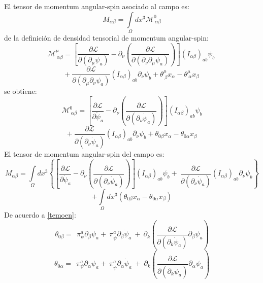 \documentclass[a4paper,12pt]{article}
\begin{document}
El tensor de momentum angular-spin asociado al campo es:
\begin{equation}
M_{\alpha\beta}=\int\limits_{\Omega}dx^{3}\mathscr{M}_{\ \alpha\beta}^{0}
\label{angularder}
\end{equation}
de la definición de densidad tensorial de momentum angular-spin:
\begin{equation}
\mathscr{M}_{\ \alpha\beta}^\mu=\left[\frac{\partial \mathscr{L} }{\partial(\partial_{\mu} \psi_a)}-\partial_{\nu}\left(\frac{\partial\mathscr{L} }{\partial(\partial_{\nu}\partial_{\mu} \psi_a)}  \right) \right](I_{\alpha\beta})_{ab}\psi_{b}\ 
\end{equation}
$$+\ \frac{\partial\mathscr{L} }{\partial(\partial_{\mu}\partial_{\nu} \psi_a)}(I_{\alpha\beta})_{ab}\partial_\nu\psi_{b}+\theta_{\ \beta}^\mu x_\alpha-\theta_{\ \alpha}^\mu x_\beta $$
se obtiene:
\begin{equation}
\mathscr{M}_{\ \alpha\beta}^0=\left[\frac{\partial \mathscr{L} }{\partial\dot \psi_a}-\partial_{\nu}\left(\frac{\partial\mathscr{L} }{\partial(\partial_{\nu}\dot \psi_a)}  \right) \right](I_{\alpha\beta})_{ab}\psi_{b}
\end{equation}
$$+\ \frac{\partial\mathscr{L} }{\partial(\partial_{\nu} \dot\psi_a)}(I_{\alpha\beta})_{ab}\partial_\nu\psi_{b}+\theta_{0\beta} x_\alpha-\theta_{0\alpha} x_\beta $$
El tensor de momentum angular-spin del campo es:
\begin{equation}
M_{\alpha\beta}=\int\limits_{\Omega}dx^{3}\left\{\left[\frac{\partial \mathscr{L} }{\partial\dot \psi_a}-\partial_{\nu}\left(\frac{\partial\mathscr{L} }{\partial(\partial_{\nu}\dot \psi_a)}  \right) \right](I_{\alpha\beta})_{ab}\psi_{b}+\ \frac{\partial\mathscr{L} }{\partial(\partial_{\nu} \dot\psi_a)}(I_{\alpha\beta})_{ab}\partial_\nu\psi_{b}\right\}
\end{equation}
$$+\int\limits_{\Omega}dx^{3}(\theta_{0\beta} x_\alpha-\theta_{0\alpha} x_\beta )$$
De acuerdo a \eqref{temoen}:
\begin{equation}
\theta_{0\beta}= \ \ \pi^{a}_{\psi}\partial_\beta\psi_a +\ \pi^{a}_{\dot\psi}\partial_\beta\dot\psi_a\ +\ \partial_k\left(\frac{\partial\mathscr{L} }{\partial(\partial_k\dot\psi_a)}\partial_\beta\psi_a\right) 
\end{equation}
\begin{equation}
\theta_{0\alpha}= \ \ \pi^{a}_{\psi}\partial_\alpha\psi_a +\ \pi^{a}_{\dot\psi}\partial_\alpha\dot\psi_a\ +\ \partial_k\left(\frac{\partial\mathscr{L} }{\partial(\partial_k\dot\psi_a)}\partial_\alpha\psi_a\right) 
\end{equation}
\end{document}
